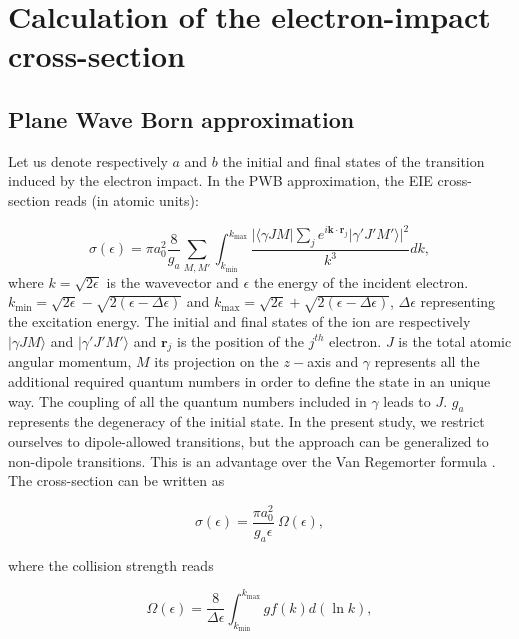 \documentclass[a4paper,10pt]{article}
\begin{document}
\section{Calculation of the electron-impact cross-section}\label{sec2}

\subsection{Plane Wave Born approximation}\label{subsec21}

\noindent Let us denote respectively $a$ and $b$ the initial and final states of the transition induced by the electron impact. In the PWB approximation, the EIE cross-section reads (in atomic units):

\begin{equation}\label{XSection}
\sigma(\epsilon)=\pi a_0^2\frac{8}{g_a}\sum_{M,M'}\int_{k_{\mathrm{min}}}^{k_{\mathrm{max}}}\frac{|\langle\gamma JM|\sum_j e^{i\textbf{k}\cdot\textbf{r}_j}|\gamma'J'M'\rangle|^2}{k^3}dk,
\end{equation}
where $k=\sqrt{2\epsilon}$ is the wavevector and $\epsilon$ the energy of the incident electron. $k_{\mathrm{min}}=\sqrt{2\epsilon}-\sqrt{2(\epsilon-\Delta\epsilon)}$ and $k_{\mathrm{max}}=\sqrt{2\epsilon}+\sqrt{2(\epsilon-\Delta\epsilon)}$, $\Delta\epsilon$ representing the excitation energy. The initial and final states of the ion are respectively $|\gamma JM\rangle$ and $|\gamma'J'M'\rangle$ and $\textbf{r}_j$ is the position of the $j^{th}$ electron. $J$ is the total atomic angular momentum, $M$ its projection on the $z-$axis and $\gamma$ represents all the additional required quantum numbers in order to define the state in an unique way. The coupling of all the quantum numbers included in $\gamma$ leads to $J$. $g_a$ represents the degeneracy of the initial state. In the present study, we restrict ourselves to dipole-allowed transitions, but the approach can be generalized to non-dipole transitions. This is an advantage over the Van Regemorter formula \cite{VANREGEMORTER62,FISHER96}. The cross-section can be written as

\begin{equation}\label{regemo}
\sigma(\epsilon)=\frac{\pi a_0^2}{g_a\epsilon}~\Omega(\epsilon),
\end{equation}

where the collision strength reads

\begin{equation*}
\Omega(\epsilon)=\frac{8}{\Delta\epsilon}\int_{k_{\mathrm{min}}}^{k_{\mathrm{max}}}gf(k)d(\ln k),
\end{equation*}
\end{document}
